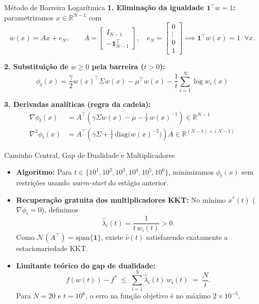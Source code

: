 \documentclass[aspectratio=43]{beamer}
\begin{document}
\begin{frame}{Método de Barreira Logarítmica}
  \textbf{1. Eliminação da igualdade $\mathbf{1}^\top w = 1$:} parametrizamos $x \in \mathbb{R}^{N-1}$ com
  \[
    w(x) = A x + e_N, \qquad
    A = \begin{bmatrix} I_{N-1} \\ -\mathbf{1}_{N-1}^\top \end{bmatrix}, \quad
    e_N = \begin{bmatrix} 0 \\ \vdots \\ 0 \\ 1 \end{bmatrix}
    \implies \mathbf{1}^\top w(x) = 1 \;\; \forall x.
  \]

  \textbf{2. Substituição de $w \ge 0$ pela barreira ($t > 0$):}
  \[
    \phi_t(x) = \frac{\gamma}{2} w(x)^\top \Sigma w(x) - \mu^\top w(x) - \frac{1}{t}\sum_{i=1}^N \log w_i(x)
  \]

  \textbf{3. Derivadas analíticas (regra da cadeia):}
  \small
  \begin{align*}
    \nabla \phi_t(x) &= A^\top\!\left(\gamma\Sigma w(x) - \mu - \frac{1}{t}\, w(x)^{-1}\right) \in \mathbb{R}^{N-1} \\
    \nabla^2 \phi_t(x) &= A^\top\!\left(\gamma\Sigma + \frac{1}{t}\,\mathrm{diag}\big(w(x)^{-2}\big)\right)A \in \mathbb{R}^{(N-1)\times(N-1)}
  \end{align*}
\end{frame}

\begin{frame}{Caminho Central, Gap de Dualidade e Multiplicadores}
  \begin{itemize}
    \item \textbf{Algoritmo:} Para $t \in \{10^1, 10^2, 10^3, 10^4, 10^5, 10^6\}$, minimizamos $\phi_t(x)$ sem restrições usando \emph{warm-start} do estágio anterior.
    \item \textbf{Recuperação gratuita dos multiplicadores KKT:} No mínimo $x^*(t)$ ($\nabla\phi_t = 0$), definimos
    \[
      \hat{\lambda}_i(t) = \frac{1}{t\, w_i(t)} > 0.
    \]
    Como $\mathcal{N}(A^\top) = \mathrm{span}\{\mathbf{1}\}$, existe $\hat{\nu}(t)$ satisfazendo exatamente a estacionariedade KKT.
    \item \textbf{Limitante teórico do gap de dualidade:}
    \[
      f(w(t)) - f^* \;\le\; \sum_{i=1}^N \hat{\lambda}_i(t)\, w_i(t) \;=\; \frac{N}{t}.
    \]
    Para $N = 20$ e $t = 10^6$, o erro na função objetivo é no máximo $2 \times 10^{-5}$.
  \end{itemize}
\end{frame}
\end{document}

